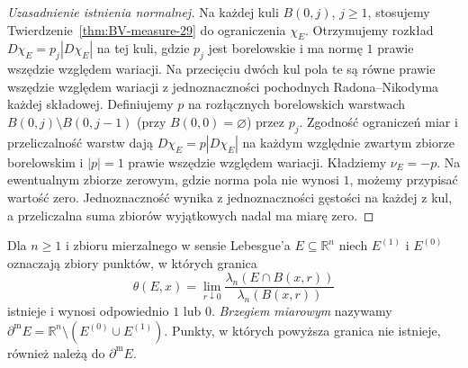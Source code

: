 \begin{proof}[Uzasadnienie istnienia normalnej]
Na każdej kuli $B(0,j)$, $j\ge1$, stosujemy
Twierdzenie~\ref{thm:BV-measure-29} do ograniczenia
$\chi_E$. Otrzymujemy rozkład
$D\chi_E=p_j|D\chi_E|$ na tej kuli, gdzie $p_j$
jest borelowskie i ma normę $1$ prawie wszędzie
względem wariacji. Na przecięciu dwóch kul
pola te są równe prawie wszędzie względem wariacji
z jednoznaczności pochodnych Radona--Nikodyma
każdej składowej. Definiujemy $p$ na rozłącznych
borelowskich warstwach $B(0,j)\setminus B(0,j-1)$
(przy $B(0,0)=\varnothing$) przez $p_j$.
Zgodność ograniczeń miar i przeliczalność warstw
dają $D\chi_E=p|D\chi_E|$ na każdym względnie
zwartym zbiorze borelowskim i $|p|=1$ prawie
wszędzie względem wariacji. Kładziemy $\nu_E=-p$.
Na ewentualnym zbiorze zerowym, gdzie norma pola
nie wynosi $1$, możemy przypisać wartość zero.
Jednoznaczność wynika z jednoznaczności gęstości
na każdej z kul, a przeliczalna suma zbiorów
wyjątkowych nadal ma miarę zero.
\end{proof}

\begin{definicja}
Dla\label{def:measure-boundary-29} $n\ge1$ i zbioru mierzalnego w sensie
Lebesgue'a $E\subseteq\mathbb R^n$
niech $E^{(1)}$ i $E^{(0)}$ oznaczają zbiory punktów,
w których granica
\[
 \theta(E,x)=\lim_{r\downarrow0}
 \frac{\lambda_n(E\cap B(x,r))}{\lambda_n(B(x,r))}
\]
istnieje i wynosi odpowiednio $1$ lub $0$.
\emph{Brzegiem miarowym} nazywamy
$\partial^{\mathrm m}E=\mathbb R^n\setminus(E^{(0)}\cup E^{(1)})$.
Punkty, w których powyższa granica nie istnieje,
również należą do $\partial^{\mathrm m}E$.
\end{definicja}

